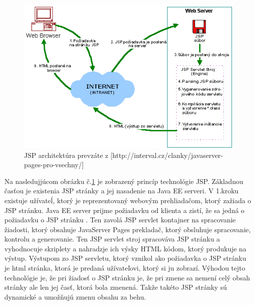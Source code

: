 \begin{figure}[htb]

\begin{center}

\includegraphics[scale=0.5]{architecture.jpg} 
\caption{JSP architektúra  prevzáte z [http://interval.cz/clanky/javaserver-pages-pro-vsechny/] }
\label{jsp}

\end{center}

\end{figure}
Na nasledujjúcom obrázku č.\ref{jsp} je zobrazený princíp technológie JSP. Základnou časťou je existenia JSP stránky a jej nasadenie na Java EE serveri. V 1.kroku existuje užívateĺ, ktorý je reprezentovaný webovým prehliadačom, ktorý zažiada o JSP stránku. Java EE server prijme požiadavku od klienta a zistí, že sa jedná o požiadavku o JSP stránku . Ten zavolá JSP servlet kontajner na spracovanie žiadosti, ktorý obsahuje JavaServer Pages prekladač, ktorý obsluhuje spracovanie, kontrolu a generovanie. Ten JSP servlet stroj spracováva JSP stránku a vyhodnocuje skriplety a nahradzje ich výsky HTML kódom, ktorý produkuje na výstup. Výstupom zo JSP servletu, ktorý vznikol ako požiadavka o JSP stránku je html stránka, ktorá je predaná užívateľovi, ktorý si ju zobrazí. Výhodou tejto technológie je, že pri žiadosť o JSP stránku je, že pri zmene sa nemení celý obsah stránky ale len jej časť, ktorá bola zmenená. Takže takéto JSP stránky sú dynamické a umožňujú zmenu obsahu za behu.



